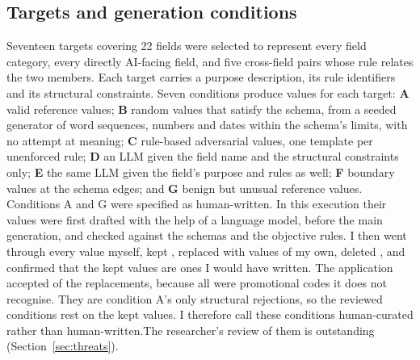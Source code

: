\documentclass[conference]{IEEEtran}
\begin{document}
\subsection{Targets and generation conditions}
Seventeen targets covering 22 fields were selected to represent every field category, every directly
AI-facing field, and five cross-field pairs whose rule relates the two members. Each target carries a
purpose description, its rule identifiers and its structural constraints. Seven conditions produce
values for each target: \textbf{A} valid reference values; \textbf{B} random values that satisfy the
schema, from a seeded generator of word sequences, numbers and dates within the schema's limits, with no
attempt at meaning; \textbf{C} rule-based adversarial values, one template per unenforced rule;
\textbf{D} an LLM given the field name and the structural constraints only; \textbf{E} the same LLM
given the field's purpose and rules as well; \textbf{F} boundary values at the schema edges; and
\textbf{G} benign but unusual reference values. Conditions A and G were
specified as human-written. In this execution their  values were first drafted with the
help of a language model, before the main generation, and checked against the schemas and the
objective rules. \ifreviewed I then went through every value myself, kept , replaced
 with values of my own, deleted , and confirmed that the kept values
are ones I would have written. The application accepted  of the
replacements, because all  were promotional codes it does not recognise. They are
condition A's only structural rejections, so the reviewed conditions rest on the kept values. I therefore call these
conditions human-curated rather than human-written.\else The researcher's review of them is outstanding
(Section~\ref{sec:threats}).\fi
\end{document}
